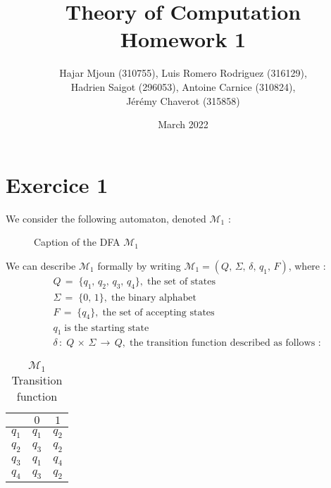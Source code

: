 \documentclass{article}
\title{Theory of Computation \\ Homework 1}
\author{Hajar Mjoun (310755), Luis Romero Rodriguez (316129),\\Hadrien Saigot (296053), Antoine Carnice (310824),\\Jérémy Chaverot (315858)}
\date{March 2022}
\begin{document}
\maketitle

\section{Exercice 1}

We consider the following automaton, denoted $\mathcal{M}_1$ :

\begin{figure}[ht] %
\centering %
\caption{Caption of the DFA $\mathcal{M}_1$}
\label{fig:my_label1}
\end{figure}

We can describe $\mathcal{M}_1$ formally by writing $\mathcal{M}_1 = (Q,\, \Sigma,\, \delta,\, q_1,\, F)$, where :
\begin{align*}
    &Q\,=\;\{q_1,\,q_2,\,q_3,\,q_4\},\;\text{the set of states}\\
    &\Sigma\,=\; \{ 0,\, 1 \}, \;\text{the binary alphabet}\\
    &F\,=\;\{q_4\},\; \text{the set of accepting states}\\
    &q_1\;\text{is the starting state}\\
    &\delta\,:\;Q\,\times\,\Sigma\,\to\,Q,\;\text{the transition function described as follows :}
\end{align*}

\begin{table}[H]
\renewcommand{\arraystretch}{1.25}
    \centering
    \begin{tabular}{|c||c|c|}
         \hline   
         &$0$&$1$  \\\hline\hline
         $q_1$&$q_1$&$q_2$  \\\hline
         $q_2$&$q_3$&$q_2$  \\\hline
         $q_3$&$q_1$&$q_4$  \\\hline
         $q_4$&$q_3$&$q_2$  \\\hline
    \end{tabular}
    \caption{$\mathcal{M}_1$\;Transition function}
    \label{tab:my_label1}
\end{table}
\end{document}
